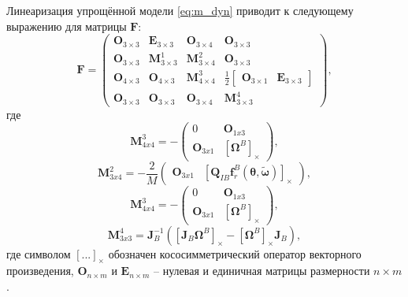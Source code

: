 Линеаризация упрощённой модели \eqref{eq:m_dyn} приводит к следующему выражению для матрицы $\bm F$:
\begin{equation}
{\bm{F}} =
\left( {\begin{array}{*{20}{c}}
	{{{\bm{O}}_{3\times3}}}&{{{\bm{E}}_{3\times3}}}&{{{\bm{O}}_{3\times4}}}&{{{\bm{O}}_{3\times3}}}\\
	{{{\bm{O}}_{3\times3}}}&{{\bm{M}}_{3\times3}^1}&{{\bm{M}}_{3\times4}^2}&{{{\bm{O}}_{3\times3}}}\\
	{{{\bm{O}}_{4\times3}}}&{{{\bm{O}}_{4\times3}}}&{{\bm{M}}_{4\times4}^3}&{\frac{1}{2}\left[ {\begin{array}{*{20}{c}}
			{{{\bm{O}}_{3\times1}}}&{{{\bm{E}}_{3\times3}}}
			\end{array}} \right]}\\
	{{{\bm{O}}_{3\times3}}}&{{{\bm{O}}_{3\times3}}}&{{{\bm{O}}_{3\times4}}}&{{\bm{M}}_{3\times3}^4}
	\end{array}} \right),
\end{equation}
где
\begin{equation}
{\bm{M}}_{4x4}^3 =  - \left( {\begin{array}{*{20}{c}}
	0&{{{\bm{O}}_{1x3}}}\\
	{{{\bm{O}}_{3x1}}}&{{{[{{\bm{\Omega }}^B}]}_ \times }}
	\end{array}} \right),
\end{equation}
\vspace{3mm}
\begin{equation}
{{\bm{M}}_{3x4}^2 =  - \frac{2}{M}\left( {\begin{array}{*{20}{c}}
		{{{\bm{O}}_{3x1}}}&{{{\left[ {{{\bm{Q}}_{IB}}{\bm{f}}_{\ddot r}^B({\bm{\theta }},{\bm{\tilde \omega }})} \right]}_ \times }}
		\end{array}} \right)},
\end{equation}
\vspace{3mm}
\begin{equation}
{{\bm{M}}_{4x4}^3 =  - \left( {\begin{array}{*{20}{c}}
		0&{{{\bm{O}}_{1x3}}}\\
		{{{\bm{O}}_{3x1}}}&{{{[{{\bm{\Omega }}^B}]}_ \times }}
		\end{array}} \right)},
\end{equation}
\vspace{3mm}
\begin{equation}
{{\bm{M}}_{3x3}^4 = {\bm{J}}_B^{ - 1}\left( {{{\left[ {{{\bm{J}}_B}{{\bm{\Omega }}^B}} \right]}_ \times } - {{\left[ {{{\bm{\Omega }}^B}} \right]}_ \times }{{\bm{J}}_B}} \right)},
\end{equation}
где символом ${\left[ {...} \right]_ \times }$  обозначен кососимметрический оператор векторного произведения,
${{{\bm{O}}_{n\times m}}}$ и ${{{\bm{E}}_{n\times m}}}$ -- нулевая и единичная матрицы размерности $n \times m$.

